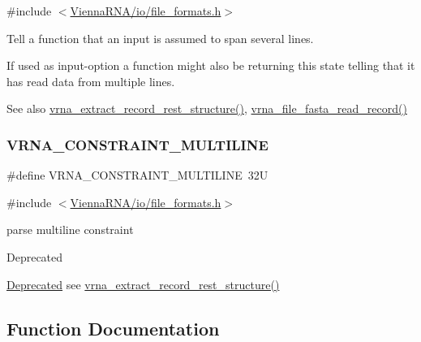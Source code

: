 {\ttfamily \#include $<$\mbox{\hyperlink{io_2file__formats_8h}{Vienna\+R\+N\+A/io/file\+\_\+formats.\+h}}$>$}



Tell a function that an input is assumed to span several lines. 

If used as input-\/option a function might also be returning this state telling that it has read data from multiple lines.

\begin{DoxySeeAlso}{See also}
\mbox{\hyperlink{group__file__formats_gad37cbb63a05eed63ba25c91628409be0}{vrna\+\_\+extract\+\_\+record\+\_\+rest\+\_\+structure()}}, \mbox{\hyperlink{group__file__formats_ga8cfb7e271efc9e1f34640acb85475639}{vrna\+\_\+file\+\_\+fasta\+\_\+read\+\_\+record()}} 
\end{DoxySeeAlso}
\mbox{\label{group__file__formats_ga7d725ef525b29891abef3f1ed42599a4}} 
\subsubsection{\texorpdfstring{VRNA\_CONSTRAINT\_MULTILINE}{VRNA\_CONSTRAINT\_MULTILINE}}
{\footnotesize\ttfamily \#define V\+R\+N\+A\+\_\+\+C\+O\+N\+S\+T\+R\+A\+I\+N\+T\+\_\+\+M\+U\+L\+T\+I\+L\+I\+NE~32U}



{\ttfamily \#include $<$\mbox{\hyperlink{io_2file__formats_8h}{Vienna\+R\+N\+A/io/file\+\_\+formats.\+h}}$>$}



parse multiline constraint 

\begin{DoxyRefDesc}{Deprecated}
\item[\mbox{\hyperlink{deprecated__deprecated000161}{Deprecated}}]see \mbox{\hyperlink{group__file__formats_gad37cbb63a05eed63ba25c91628409be0}{vrna\+\_\+extract\+\_\+record\+\_\+rest\+\_\+structure()}} \end{DoxyRefDesc}


\subsection{Function Documentation}
\mbox{\label{group__file__formats_gaaface7db12fadc3d271641c4515ab6e4}} 
